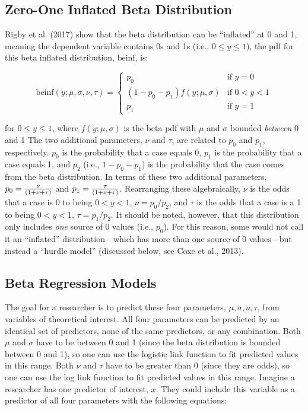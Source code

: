 \documentclass[english,,man]{apa6}
\begin{document}
\hypertarget{zero-one-inflated-beta-distribution}{%
\subsection{Zero-One Inflated Beta Distribution}\label{zero-one-inflated-beta-distribution}}

Rigby et al. (2017) show that the beta distribution can be \enquote{inflated} at 0 and 1, meaning the dependent variable contains 0s and 1s (i.e., \(0 \leq y \leq 1\)), the pdf for this beta inflated distribution, \(\text{beinf}\), is:

\begin{center}
\[
\text{beinf}(y;\mu,\sigma,\nu,\tau) =
\begin{cases}
  p_0                             & \text{if } y = 0\\
  (1 - p_0 - p_1)f(y;\mu,\sigma)  & \text{if } 0 < y < 1\\
  p_1                             & \text{if } y = 1
\end{cases}
\]
\end{center}

for \(0 \leq y \leq 1\), where \(f(y;\mu,\sigma)\) is the beta pdf with \(\mu\) and \(\sigma\) bounded \emph{between} 0 and 1 The two additional parameters, \(\nu\) and \(\tau\), are related to \(p_0\) and \(p_1\), respectively. \(p_0\) is the probability that a case equals 0, \(p_1\) is the probability that a case equals 1, and \(p_2\) (i.e., \(1 - p_0 - p_1\)) is the probability that the case comes from the beta distribution. In terms of these two additional parameters, \(p_0 = {\nu \over (1 + \nu + \tau)}\) and \(p_1 = {\tau \over (1 + \nu + \tau)}\). Rearranging these algebraically, \(\nu\) is the odds that a case is 0 to being \(0 < y < 1\), \(\nu = p_0 / p_2\), and \(\tau\) is the odds that a case is a 1 to being \(0 < y < 1\), \(\tau = p_1 / p_2\). It should be noted, however, that this distribution only includes \emph{one} source of 0 values (i.e., \(p_0\)). For this reason, some would not call it an \enquote{inflated} distribution---which has more than one source of 0 values---but instead a \enquote{hurdle model} (discussed below, see Coxe et al., 2013).

\hypertarget{beta-regression-models}{%
\subsection{Beta Regression Models}\label{beta-regression-models}}

The goal for a researcher is to predict these four parameters, \(\mu, \sigma, \nu, \tau\), from variables of theoretical interest. All four parameters can be predicted by an identical set of predictors, none of the same predictors, or any combination. Both \(\mu\) and \(\sigma\) have to be between 0 and 1 (since the beta distribution is bounded between 0 and 1), so one can use the logistic link function to fit predicted values in this range. Both \(\nu\) and \(\tau\) have to be greater than 0 (since they are odds), so one can use the log link function to fit predicted values in this range. Imagine a researcher has one predictor of interest, \(x\). They could include this variable as a predictor of all four parameters with the following equations:
\end{document}
